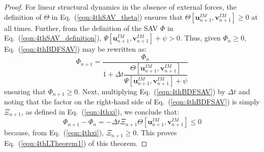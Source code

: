 \documentclass[10pt,a4paper]{amsart}
\begin{document}
\begin{proof}
  For linear structural dynamics in the absence of external forces, the definition of $\Theta$ in Eq.~(\ref{eqn:4thSAV_theta}) ensures that $\Theta[\boldsymbol{u}_{n+1}^{IM},\boldsymbol{v}_{n+1}^{IM}] \ge 0$ at all times. 
  Further, from the definition of the SAV $\Phi$ in Eq.~(\ref{eqn:4thSAV_definition}), $\Psi[\boldsymbol{u}_{n+1}^{IM},\boldsymbol{v}_{n+1}^{IM}]+\psi > 0$.
  Thus, given $\Phi_n\ge0$, Eq.~(\ref{eqn:4thBDFSAV}) may be rewritten as:
  \begin{equation}
      \Phi_{n+1} = \dfrac{\Phi_n}{ 1+\Delta t\dfrac{\Theta[\boldsymbol{u}_{n+1}^{IM},\boldsymbol{v}_{n+1}^{IM}]}{\Psi[\boldsymbol{u}_{n+1}^{IM},\boldsymbol{v}_{n+1}^{IM}]+\psi} } 
      \label{eqn:4thTimestepping2}
  \end{equation}  
  ensuring that $\Phi_{n+1} \ge 0$.
  Next, multiplying Eq.~(\ref{eqn:4thBDFSAV}) by $\Delta t$ and noting that the factor on the right-hand side of Eq.~(\ref{eqn:4thBDFSAV}) is simply $\Xi_{n+1}$, as defined in Eq.~(\ref{eqn:4thxi}), we conclude that:
  \begin{equation}
      \Phi_{n+1}-\Phi_n = -\Delta t\Xi_{n+1}\Theta[\boldsymbol{u}_{n+1}^{IM},\boldsymbol{v}_{n+1}^{IM}] \le 0
  \end{equation}
  because, from Eq.~(\ref{eqn:4thxi}), $\Xi_{n+1} \ge 0$.
  This proves Eq.~(\ref{eqn:4thLTheorem1}) of this theorem.
  

\end{proof}
\end{document}
